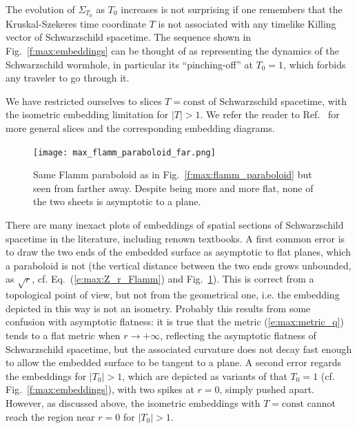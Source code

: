 The evolution of $\Sigma_{T_0}$ as $T_0$ increases is not surprising if one
remembers that the Kruskal-Szekeres time coordinate $T$ is not associated
with any timelike Killing vector of Schwarzschild spacetime.
The sequence shown in Fig.~\ref{f:max:embeddings} can be thought of as
representing the dynamics of the Schwarzschild wormhole, in particular
its ``pinching-off'' at $T_0=1$, which forbids any traveler to go through it.

\begin{remark}
We have restricted ourselves to slices $T=\mathrm{const}$ of Schwarzschild
spacetime, with the isometric embedding limitation for $|T|>1$. We refer the
reader to Ref.~\cite{CollaK12} for more general slices and the corresponding
embedding diagrams.
\end{remark}

\begin{figure}
\centerline{\texttt{[image: max\_flamm\_paraboloid\_far.png]}}
\caption[]{\label{f:max:flamm_paraboloid_far} \footnotesize
Same Flamm paraboloid as in Fig.~\ref{f:max:flamm_paraboloid}
but seen from farther away. Despite being more and more flat, none of the two sheets
is asymptotic to a plane.}
\end{figure}

\begin{remark}
There are many inexact plots of embeddings of spatial sections
of Schwarz\-schild spacetime in the literature, including renown textbooks.
A first common error is to draw the two ends of the embedded surface as asymptotic to flat
planes, which a paraboloid is not (the vertical distance between the two ends grows
unbounded, as $\sqrt{r}$, cf. Eq.~(\ref{e:max:Z_r_Flamm}) and Fig.~\ref{f:max:flamm_paraboloid_far}).
This is correct from a topological point of view,
but not from the geometrical one, i.e. the embedding depicted in this way
is not an isometry. Probably this results from some confusion with asymptotic
flatness: it is true that the metric (\ref{e:max:metric_q}) tends
to a flat metric when $r\rightarrow +\infty$, reflecting the asymptotic
flatness of Schwarzschild spacetime, but the associated curvature does not
decay fast enough to allow the embedded surface to be tangent to a plane.
A second error regards the embeddings for $|T_0|> 1$, which
are depicted as variants of that $T_0=1$ (cf. Fig.~\ref{f:max:embeddings}),
with two spikes at $r=0$, simply pushed apart. However,
as discussed above, the isometric embeddings with $T=\mathrm{const}$
cannot reach the region near $r=0$ for $|T_0|> 1$.
\end{remark}

